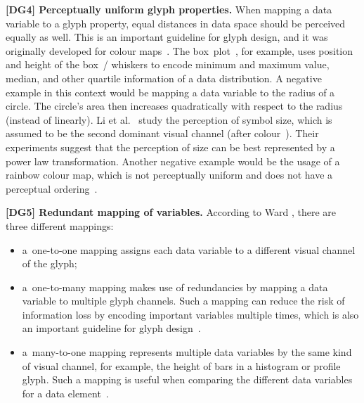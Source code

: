\textbf{[DG4] Perceptually uniform glyph properties.}
When mapping a data variable to a glyph property, equal distances in data space should be perceived equally as well.
This is an important guideline for glyph design, and it was originally developed for colour maps~\cite{Rogowitz96lieWithVis}.
The box~plot~\cite{mcGill78boxPlots}, for example, uses position and height of the box~/ whiskers to encode minimum and maximum value, median, and other quartile information of a data distribution.
A negative example in this context would be mapping a data variable to the radius of a circle. The circle's area then increases quadratically with respect to the radius (instead of linearly).
Li et al.~\cite{Li10symbolSize} study the perception of symbol size, which is assumed to be the second dominant visual channel (after colour~\cite{Christ75color}).
Their experiments suggest that the perception of size can be best represented by a power law transformation. %
Another negative example would be the usage of a rainbow colour map, which is not perceptually uniform and does not have a perceptual ordering~\cite{BorlandTaylor07rainbowColormap}.

\textbf{[DG5] Redundant mapping of variables.}
According to Ward \cite{ward08glyphs}, there are three different mappings: 
\begin{itemize}
	\item a~one-to-one mapping assigns each data variable to a different visual channel of the glyph;
 \item a~one-to-many mapping makes use of redundancies by mapping a data variable to multiple glyph channels.  Such a mapping can reduce the risk of information loss by encoding important variables multiple times, which is also an important guideline for glyph design~\cite{lie09glyphs, Ropinski11glyphs}.
 \item a~many-to-one mapping represents multiple data variables by the same kind of visual channel, for example, the height of bars in a histogram or profile glyph.  Such a mapping is useful when comparing the different data variables for a data element~\cite{ward08glyphs}.
\end{itemize}

